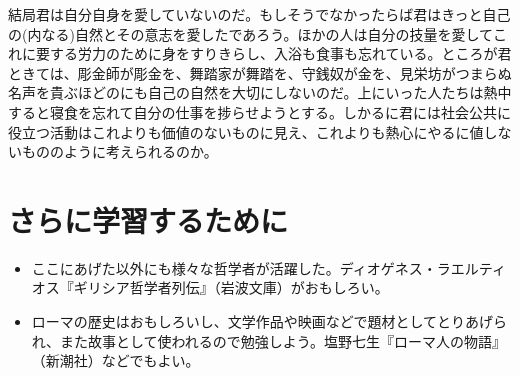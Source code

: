 \documentclass[uplatex,dvipdfmx]{jsarticle} \usepackage{mystyle}%
\begin{document}
  結局君は自分自身を愛していないのだ。もしそうでなかったらば君はきっと自己の(内なる)自然とその意志を愛したであろう。ほかの人は自分の技量を愛してこれに要する労力のために身をすりきらし、入浴も食事も忘れている。ところが君ときては、彫金師が彫金を、舞踏家が舞踏を、守銭奴が金を、見栄坊がつまらぬ名声を貴ぶほどのにも自己の自然を大切にしないのだ。上にいった人たちは熱中すると寝食を忘れて自分の仕事を捗らせようとする。しかるに君には社会公共に役立つ活動はこれよりも価値のないものに見え、これよりも熱心にやるに値しないもののように考えられるのか。


\section{さらに学習するために}

\begin{itemize}
\item ここにあげた以外にも様々な哲学者が活躍した。ディオゲネス・ラエルティオス『ギリシア哲学者列伝』（岩波文庫）がおもしろい。
\item ローマの歴史はおもしろいし、文学作品や映画などで題材としてとりあげられ、また故事として使われるので勉強しよう。塩野七生『ローマ人の物語』（新潮社）などでもよい。
\end{itemize}





 \nocite{エピクロス59:教説と手紙}
 \nocite{エピクテートス58:人生談議:岩波}
 \nocite{マルクスアウレリウス56:自省録}
 \nocite{水田洋06:社会思想小史}

\fi
\ifx\mybook\undefined


\end{document}
